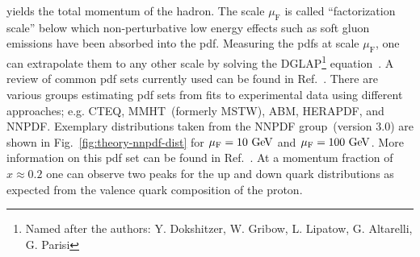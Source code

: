 yields the total momentum of the hadron. The scale $\mu_\mathrm{F}$ is called ``factorization scale'' below which non-perturbative low energy effects such as soft gluon emissions have been absorbed into the \gls{pdf}. Measuring the \glspl{pdf} at scale $\mu_\mathrm{F}$, one can extrapolate them to any other scale by solving the DGLAP\footnote{Named after the authors: Y. Dokshitzer, W. Gribow, L. Lipatow, G. Altarelli, G. Parisi} equation~\cite{Dokshitzer:1977sg,Gribov:1972ri,Altarelli:1977zs}. A review of common \gls{pdf} sets currently used can be found in Ref.~\cite{Accardi2016}. There are various groups estimating \gls{pdf} sets from fits to experimental data using different approaches; e.g. CTEQ, MMHT~(formerly MSTW), ABM, HERAPDF, and NNPDF. Exemplary distributions taken from the NNPDF group~(version 3.0) are shown in Fig.~\ref{fig:theory-nnpdf-dist} for $\mu_\mathrm{F}=10~\mathrm{GeV}$ and $\mu_\mathrm{F}=100~\mathrm{GeV}$. More information on this \gls{pdf} set can be found in Ref.~\cite{Ball:2014uwa}. At a momentum fraction of $x\approx0.2$ one can observe two peaks for the up and down quark distributions as expected from the valence quark composition of the proton.


